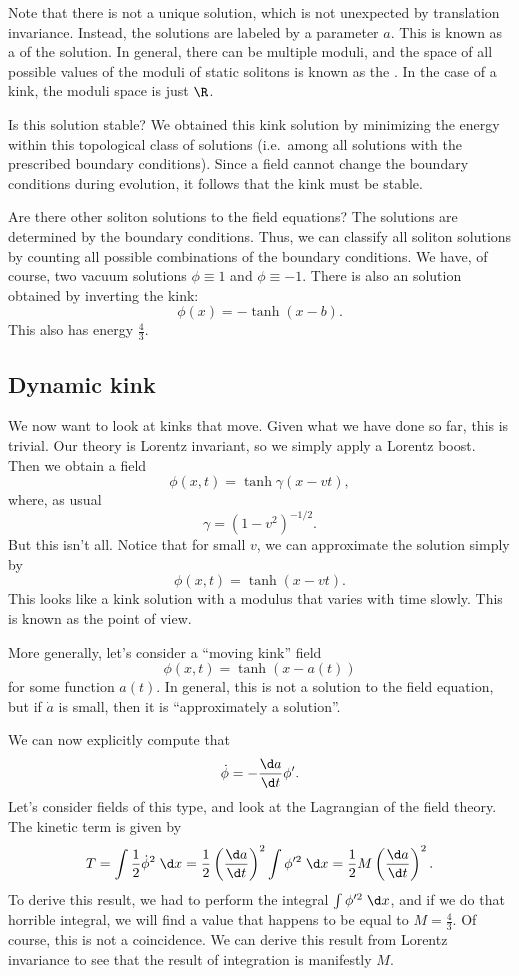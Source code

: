 \documentclass[a4paper]{article}
\begin{document}
Note that there is not a unique solution, which is not unexpected by translation invariance. Instead, the solutions are labeled by a parameter $a$. This is known as a  of the solution. In general, there can be multiple moduli, and the space of all possible values of the moduli of static solitons is known as the . In the case of a kink, the moduli space is just $\R$.

Is this solution stable? We obtained this kink solution by minimizing the energy within this topological class of solutions (i.e.\ among all solutions with the prescribed boundary conditions). Since a field cannot change the boundary conditions during evolution, it follows that the kink must be stable.

Are there other soliton solutions to the field equations? The solutions are determined by the boundary conditions. Thus, we can classify all soliton solutions by counting all possible combinations of the boundary conditions. We have, of course, two vacuum solutions $\phi \equiv 1$ and $\phi \equiv -1$. There is also an  solution obtained by inverting the kink:
\[
  \phi(x) = - \tanh (x - b).
\]
This also has energy $\frac{4}{3}$.

\subsection{Dynamic kink}
We now want to look at kinks that move. Given what we have done so far, this is trivial. Our theory is Lorentz invariant, so we simply apply a Lorentz boost. Then we obtain a field
\[
  \phi(x, t) = \tanh \gamma (x - vt),
\]
where, as usual
\[
  \gamma = (1 - v^2)^{-1/2}.
\]
But this isn't all. Notice that for small $v$, we can approximate the solution simply by
\[
  \phi(x, t) = \tanh (x - vt).
\]
This looks like a kink solution with a modulus that varies with time slowly. This is known as the  point of view.

More generally, let's consider a ``moving kink'' field
\[
  \phi(x, t) = \tanh (x - a(t))
\]
for some function $a(t)$. In general, this is not a solution to the field equation, but if $\dot{a}$ is small, then it is ``approximately a solution''.

We can now explicitly compute that
\[
  \dot{\phi} = - \frac{\d a}{\d t} \phi'.
\]
Let's consider fields of this type, and look at the Lagrangian of the field theory. The kinetic term is given by
\[
  T = \int \frac{1}{2} \dot{\phi}^2\;\d x = \frac{1}{2} \left(\frac{\d a}{\d t}\right)^2 \int \phi'^2 \;\d x = \frac{1}{2} M \left(\frac{\d a}{\d t}\right)^2.
\]
To derive this result, we had to perform the integral $\int \phi'^2 \;\d x$, and if we do that horrible integral, we will find a value that happens to be equal to $M = \frac{4}{3}$. Of course, this is not a coincidence. We can derive this result from Lorentz invariance to see that the result of integration is manifestly $M$.
\end{document}

